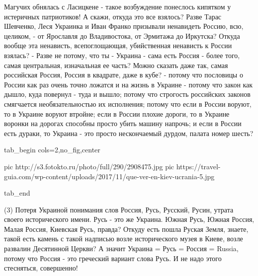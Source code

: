 Магучих обнялась с Ласицкене - такое возбуждение понеслось кипятком у
истеричных патриотиков! А скажи, откуда это все взялось? Разве Тарас Шевченко,
Леся Украинка и Иван Франко призывали ненавидеть Россию, всю, целиком, - от
Ярославля до Владивостока, от Эрмитажа до Иркутска? Откуда вообще эта
ненависть, всепоглощающая, убийственная ненависть к России взялась? - Разве не
потому, что ты - Украина - сама есть Россия - более того, самая центральная,
изначальная ее часть? Можно сказать даже так, самая российская Россия, Россия в
квадрате, даже в кубе? - потому что пословицы о России как раз очень точно
ложатся и на жизнь в Украине - потому что закон как дышло, куда повернул - туда
и вышло; потому что строгость российских законов смягчается необязательностью
их исполнения; потому что если в России воруют, то в Украине воруют втройне;
если в России плохие дороги, то в Украине воронки на дорогах способны просто
убить машину напрочь; и если в России есть дураки, то Украина - это просто
нескончаемый дурдом, палата номер шесть?

\ifcmt
  tab_begin cols=2,no_fig,center

     pic http://s3.fotokto.ru/photo/full/290/2908475.jpg
     pic https://travel-guia.com/wp-content/uploads/2017/11/que-ver-en-kiev-ucrania-5.jpg

  tab_end
\fi

(3) Потеря Украиной понимания слов Россия, Русь, Русский, Русин, утрата своего
исторического имени. Русь - это же Украина. Южная Русь, Южная Россия, Малая
Россия, Киевская Русь, правда?  Откуду есть пошла Руская Земля, знаете, такой
есть камень с такой надписью возле исторического музея в Киеве, возле развалин
Десятинной Церкви?  А значит Украина = Русь = Россия = Russia, потому что
Россия - это греческий вариант слова Русь. И не надо этого стесняться,
совершенно! 

